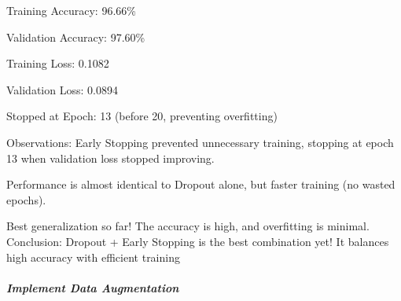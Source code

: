 \documentclass[11pt]{article}
\begin{document}
Training Accuracy: 96.66\%

Validation Accuracy: 97.60\%

Training Loss: 0.1082

Validation Loss: 0.0894

Stopped at Epoch: 13 (before 20, preventing overfitting)

Observations: Early Stopping prevented unnecessary training, stopping at
epoch 13 when validation loss stopped improving.

Performance is almost identical to Dropout alone, but faster training
(no wasted epochs).

Best generalization so far! The accuracy is high, and overfitting is
minimal. Conclusion: Dropout + Early Stopping is the best combination
yet! It balances high accuracy with efficient training

    

    \subparagraph{Implement Data
Augmentation}\label{implement-data-augmentation}
\end{document}
